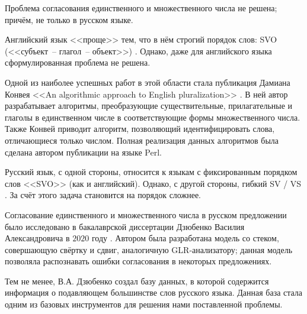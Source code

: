 \documentclass[main]{subfiles}
\begin{document}
Проблема согласования единственного и множественного числа не решена; причём, не только в русском языке.

Английский язык <<проще>> тем, что в нём строгий порядок слов: SVO (<<субъект~-- глагол~-- объект>>) \cite{synt}. Однако, даже для английского языка сформулированная проблема не решена. 

Одной из наиболее успешных работ в этой области стала публикация Дамиана Конвея <<An algorithmic approach to English pluralization>> \cite{plur}. В ней автор разрабатывает алгоритмы, преобразующие существительные, прилагательные и глаголы в единственном числе в соответствующие формы множественного числа. Также Конвей приводит алгоритм, позволяющий идентифицировать слова, отличающиеся только числом. Полная реализация данных алгоритмов была сделана автором публикации на языке Perl.

Русский язык, с одной стороны, относится к языкам с фиксированным порядком слов <<SVO>> (как и английский). Однако, с другой стороны, гибкий SV / VS \cite{ox}. За счёт этого задача становится на порядок сложнее. 

Согласование единственного и множественного числа в русском предложении было исследовано в бакалаврской диссертации Дзюбенко Василия Александровича в $2020$ году \cite{dz}. Автором была разработана модель со стеком, совершающую свёртку и сдвиг, аналогичную GLR-анализатору; данная модель позволяла распознавать ошибки согласования в некоторых предложениях.

Тем не менее, В.А. Дзюбенко создал базу данных, в которой содержится информация о подавляющем большинстве слов русского языка. Данная база стала одним из базовых инструментов для решения нами поставленной проблемы.
\end{document}
